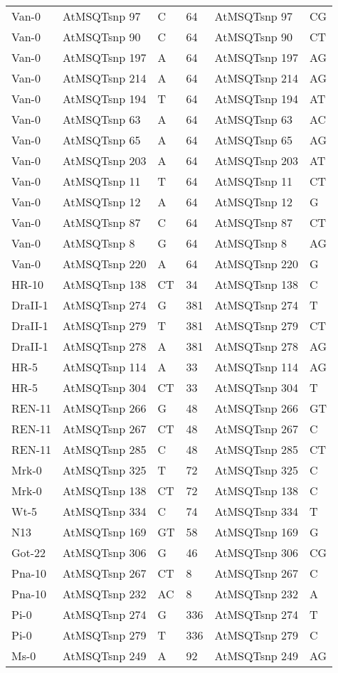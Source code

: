 \begin{center}
\begin{longtable}{|l|l|l|l|l|l|}
Van-0&AtMSQTsnp 97&C&64&AtMSQTsnp 97&CG\\
Van-0&AtMSQTsnp 90&C&64&AtMSQTsnp 90&CT\\
Van-0&AtMSQTsnp 197&A&64&AtMSQTsnp 197&AG\\
Van-0&AtMSQTsnp 214&A&64&AtMSQTsnp 214&AG\\
Van-0&AtMSQTsnp 194&T&64&AtMSQTsnp 194&AT\\
Van-0&AtMSQTsnp 63&A&64&AtMSQTsnp 63&AC\\
Van-0&AtMSQTsnp 65&A&64&AtMSQTsnp 65&AG\\
Van-0&AtMSQTsnp 203&A&64&AtMSQTsnp 203&AT\\
Van-0&AtMSQTsnp 11&T&64&AtMSQTsnp 11&CT\\
Van-0&AtMSQTsnp 12&A&64&AtMSQTsnp 12&G\\
Van-0&AtMSQTsnp 87&C&64&AtMSQTsnp 87&CT\\
Van-0&AtMSQTsnp 8&G&64&AtMSQTsnp 8&AG\\
Van-0&AtMSQTsnp 220&A&64&AtMSQTsnp 220&G\\
HR-10&AtMSQTsnp 138&CT&34&AtMSQTsnp 138&C\\
DraII-1&AtMSQTsnp 274&G&381&AtMSQTsnp 274&T\\
DraII-1&AtMSQTsnp 279&T&381&AtMSQTsnp 279&CT\\
DraII-1&AtMSQTsnp 278&A&381&AtMSQTsnp 278&AG\\
HR-5&AtMSQTsnp 114&A&33&AtMSQTsnp 114&AG\\
HR-5&AtMSQTsnp 304&CT&33&AtMSQTsnp 304&T\\
REN-11&AtMSQTsnp 266&G&48&AtMSQTsnp 266&GT\\
REN-11&AtMSQTsnp 267&CT&48&AtMSQTsnp 267&C\\
REN-11&AtMSQTsnp 285&C&48&AtMSQTsnp 285&CT\\
Mrk-0&AtMSQTsnp 325&T&72&AtMSQTsnp 325&C\\
Mrk-0&AtMSQTsnp 138&CT&72&AtMSQTsnp 138&C\\
Wt-5&AtMSQTsnp 334&C&74&AtMSQTsnp 334&T\\
N13&AtMSQTsnp 169&GT&58&AtMSQTsnp 169&G\\
Got-22&AtMSQTsnp 306&G&46&AtMSQTsnp 306&CG\\
Pna-10&AtMSQTsnp 267&CT&8&AtMSQTsnp 267&C\\
Pna-10&AtMSQTsnp 232&AC&8&AtMSQTsnp 232&A\\
Pi-0&AtMSQTsnp 274&G&336&AtMSQTsnp 274&T\\
Pi-0&AtMSQTsnp 279&T&336&AtMSQTsnp 279&C\\
Ms-0&AtMSQTsnp 249&A&92&AtMSQTsnp 249&AG\\

\end{longtable}
\end{center}
